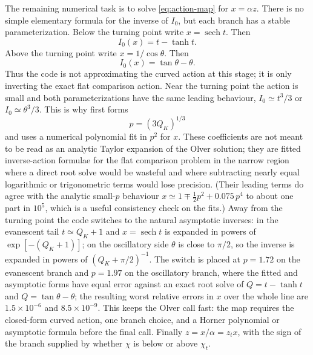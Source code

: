 \documentclass[11pt,a4paper]{article}
\newcommand{\code}[1]{\texttt{\detokenize{#1}}}
\newcommand{\sech}{\operatorname{sech}}
\begin{document}
The remaining numerical task is to solve \eqref{eq:action-map} for
\(x=\alpha z\).  There is no simple elementary formula for the inverse of
\(I_0\), but each branch has a stable parameterization.  Below the turning point
write \(x=\sech t\).  Then
\begin{equation}
  I_0(x)=t-\tanh t.
\end{equation}
Above the turning point write \(x=1/\cos\theta\).  Then
\begin{equation}
  I_0(x)=\tan\theta-\theta.
\end{equation}
Thus the code is not approximating the curved action at this stage; it is only
inverting the exact flat comparison action.  Near the turning point the action
is small and both parameterizations have the same leading behaviour,
\(I_0\simeq t^3/3\) or \(I_0\simeq\theta^3/3\).  This is why
\code{invert_flat_action} first forms
\begin{equation}
  p=(3Q_K)^{1/3}
\end{equation}
and uses a numerical polynomial fit in \(p^2\) for \(x\).  These coefficients
are not meant to be read as an analytic Taylor expansion of the Olver
solution; they are fitted inverse-action formulae for the flat comparison
problem in the narrow region where a direct root solve would be wasteful and
where subtracting nearly equal logarithmic or trigonometric terms would lose
precision.  (Their leading terms do agree with the analytic small-\(p\)
behaviour \(x\simeq1\mp\tfrac12 p^2+0.075\,p^4\) to about one part in
\(10^{5}\), which is a useful consistency check on the fits.)  Away from the
turning point the code switches to the natural
asymptotic inverses: in the evanescent tail \(t\simeq Q_K+1\) and
\(x=\sech t\) is expanded in powers of \(\exp[-(Q_K+1)]\); on the oscillatory
side \(\theta\) is close to \(\pi/2\), so the inverse is expanded in powers of
\((Q_K+\pi/2)^{-1}\).  The switch is placed at \(p=1.72\) on the evanescent
branch and \(p=1.97\) on the oscillatory branch, where the fitted and asymptotic
forms have equal error against an exact root solve of \(Q=t-\tanh t\) and
\(Q=\tan\theta-\theta\); the resulting worst relative errors in \(x\) over the
whole line are \(1.5\times10^{-6}\) and \(8.5\times10^{-9}\).  This keeps the Olver call fast: the map requires the
closed-form curved action, one branch choice, and a Horner polynomial or
asymptotic formula before the final \code{BJL} call.  Finally
\(z=x/\alpha=z_t x\), with the sign of the branch supplied by whether \(\chi\)
is below or above \(\chi_t\).
\end{document}
